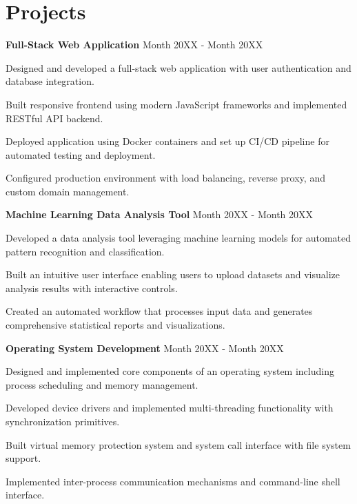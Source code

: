 \documentclass[11pt, a4paper]{article}
\newcommand{\resumeItem}[1]{
  \item\small{
    {#1 \vspace{-2pt}}
  }
}
\newcommand{\resumeProjectHeading}[2]{
  \textbf{\small#1} \hfill \small{#2}
  \vspace{4pt}
}
\begin{document}
\section{Projects}
\vspace{-5pt}

\resumeProjectHeading
{Full-Stack Web Application}{Month 20XX - Month 20XX}
\begin{resumeItemList}
  \resumeItem{Designed and developed a full-stack web application with user authentication and database integration.}
  \resumeItem{Built responsive frontend using modern JavaScript frameworks and implemented RESTful API backend.}
  \resumeItem{Deployed application using Docker containers and set up CI/CD pipeline for automated testing and deployment.}
  \resumeItem{Configured production environment with load balancing, reverse proxy, and custom domain management.}
\end{resumeItemList}
\vspace{6pt}

\resumeProjectHeading
{Machine Learning Data Analysis Tool}{Month 20XX - Month 20XX}
\begin{resumeItemList}
  \resumeItem{Developed a data analysis tool leveraging machine learning models for automated pattern recognition and classification.}
  \resumeItem{Built an intuitive user interface enabling users to upload datasets and visualize analysis results with interactive controls.}
  \resumeItem{Created an automated workflow that processes input data and generates comprehensive statistical reports and visualizations.}
\end{resumeItemList}
\vspace{6pt}

\resumeProjectHeading
{Operating System Development}{Month 20XX - Month 20XX}
\begin{resumeItemList}
  \resumeItem{Designed and implemented core components of an operating system including process scheduling and memory management.}
  \resumeItem{Developed device drivers and implemented multi-threading functionality with synchronization primitives.}
  \resumeItem{Built virtual memory protection system and system call interface with file system support.}
  \resumeItem{Implemented inter-process communication mechanisms and command-line shell interface.}
\end{resumeItemList}
\end{document}
